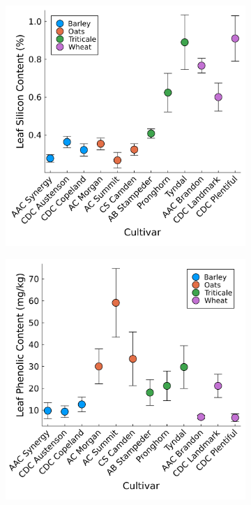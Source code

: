 \documentclass[12pt, letterpaper, ]{report}
\begin{document}
\begin{figure}[h]
        \centering
        \begin{subfigure}[b]{0.49\textwidth}
                \centering
                \includegraphics[width = \textwidth]{images/spp_si_content.png}
        \end{subfigure}
        \begin{subfigure}[b]{0.49\textwidth}
                \centering
                \includegraphics[width = \textwidth]{images/spp_phenolic_content.png}
        \end{subfigure}
                

\end{figure}
\end{document}
